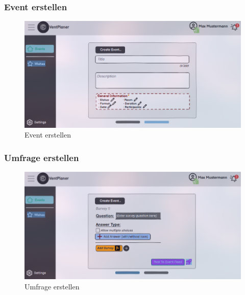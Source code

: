 \documentclass[a4paper,12pt]{article}
\begin{document}
\subsubsection{Event erstellen}
\begin{figure}[H]
    \centering
    \includegraphics[width=1\textwidth]{Abbildungen/events/create_event.png}
    \caption{Event erstellen}
    \label{fig:create_event}
\end{figure}

\subsubsection{Umfrage erstellen}
\begin{figure}[H]
    \centering
    \includegraphics[width=1\textwidth]{Abbildungen/events/create_survey.png}
    \caption{Umfrage erstellen}
    \label{fig:create_survey}
\end{figure}
\end{document}
